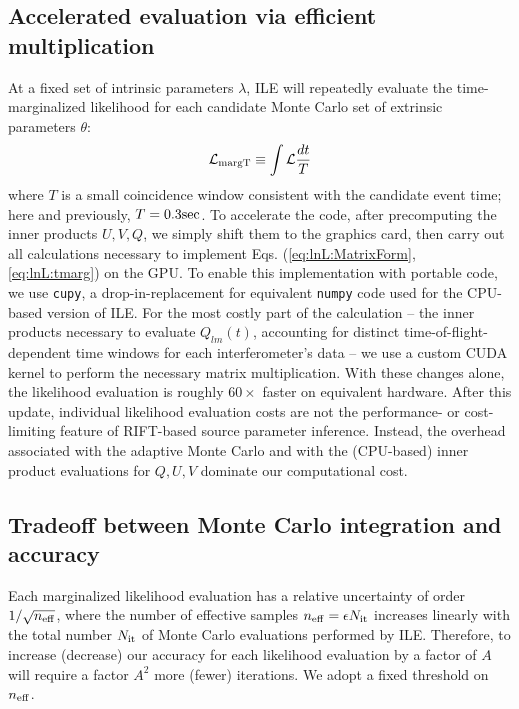 \documentclass[twocolumn,prd,nofootinbib]{revtex4}
\newcommand\unit[1]{{\rm #1}}
\newcommand\ILE{ILE}
\begin{document}
\subsection{Accelerated evaluation via efficient multiplication}


At a fixed set of intrinsic parameters $\lambda$, \ILE{} will repeatedly evaluate the time-marginalized likelihood 
for each candidate Monte Carlo set of extrinsic parameters $\theta$:
\begin{eqnarray}
{\cal L}_{\rm margT} \equiv  \int {\cal L} \frac{dt}{T}
\label{eq:lnL:tmarg}
\end{eqnarray}
where $T$ is a small coincidence window consistent with the candidate event time; here and previously,
$T=0.3\unit{sec}$.   To accelerate the code, after precomputing the inner products $U,V,Q$, we simply shift them to the
graphics card, then carry out all calculations necessary to implement Eqs. (\ref{eq:lnL:MatrixForm}, \ref{eq:lnL:tmarg})
on the GPU.  To enable this implementation with portable code, we use \texttt{cupy}, a drop-in-replacement for equivalent
\texttt{numpy} code used for the CPU-based version of ILE.    For the most costly part of the calculation -- the inner
products necessary to evaluate $Q_{lm}(t)$, accounting for distinct time-of-flight-dependent time windows for each
interferometer's data -- we use a custom CUDA kernel to perform the necessary matrix multiplication.  
%
With these changes alone, the likelihood evaluation is roughly $60\times$ faster on equivalent hardware.  
After this update, individual likelihood evaluation costs are not the performance- or cost-limiting feature of RIFT-based source
parameter inference.  Instead, the overhead associated with the adaptive Monte Carlo and with the (CPU-based) inner
product evaluations for $Q,U,V$ dominate our computational cost.



\subsection{Tradeoff between Monte Carlo integration and accuracy}

Each marginalized likelihood evaluation has a relative uncertainty of order  $1/\sqrt{n_{\rm eff}}$, where the number of
effective samples $n_{\rm eff}=\epsilon N_{\rm it}$ increases linearly with the total number $N_{\rm it}$ of Monte Carlo
evaluations performed by \ILE{}.  Therefore, to increase (decrease) our accuracy for each likelihood evaluation by a factor of $A$
will require a factor $A^2$ more (fewer) iterations.   
%
We adopt a fixed threshold on $n_{\rm eff}$.  
\end{document}

